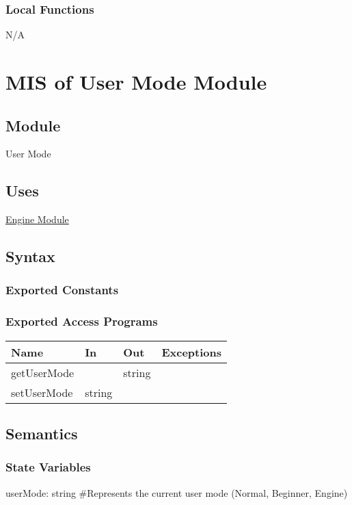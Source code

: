 \documentclass[12pt, titlepage]{article}
\begin{document}
    \subsubsection{Local Functions}
    N/A

    \newpage

\section{MIS of User Mode Module} \label{mMode}

    \subsection{Module}
    User Mode

    \subsection{Uses}
    \hyperref[mEngine]{Engine Module}

    \subsection{Syntax}
    \subsubsection{Exported Constants}

    \subsubsection{Exported Access Programs}
        \begin{center}
        \begin{tabular}{p{4.5cm} p{4cm} p{3cm} p{2.5cm}}
        \hline
        \textbf{Name} & \textbf{In} & \textbf{Out} & \textbf{Exceptions} \\
        \hline
        getUserMode & & string & \\
        \hline
        setUserMode & string & & \\
        \hline
        \end{tabular}
        \end{center}

    \subsection{Semantics}
    \subsubsection{State Variables}
    userMode: string \#Represents the current user mode (Normal, Beginner, Engine)
\end{document}
